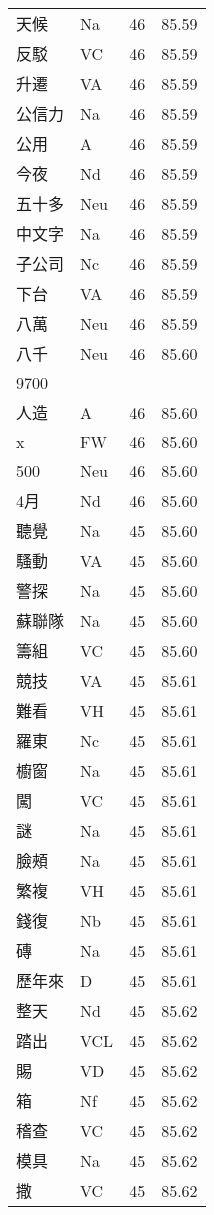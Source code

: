 \documentclass[twocolumn]{book}
\begin{document}
\begin{supertabular}{llrr}
天候 & Na & 46 &  85.59\\
反駁 & VC & 46 &  85.59\\
升遷 & VA & 46 &  85.59\\
公信力 & Na & 46 &  85.59\\
公用 & A & 46 &  85.59\\
今夜 & Nd & 46 &  85.59\\
五十多 & Neu & 46 &  85.59\\
中文字 & Na & 46 &  85.59\\
子公司 & Nc & 46 &  85.59\\
下台 & VA & 46 &  85.59\\
八萬 & Neu & 46 &  85.59\\
八千 & Neu & 46 &  85.60\\
9700\\
人造 & A & 46 &  85.60\\
x & FW & 46 &  85.60\\
500 & Neu & 46 &  85.60\\
4月 & Nd & 46 &  85.60\\
聽覺 & Na & 45 &  85.60\\
騷動 & VA & 45 &  85.60\\
警探 & Na & 45 &  85.60\\
蘇聯隊 & Na & 45 &  85.60\\
籌組 & VC & 45 &  85.60\\
競技 & VA & 45 &  85.61\\
難看 & VH & 45 &  85.61\\
羅東 & Nc & 45 &  85.61\\
櫥窗 & Na & 45 &  85.61\\
闖 & VC & 45 &  85.61\\
謎 & Na & 45 &  85.61\\
臉頰 & Na & 45 &  85.61\\
繁複 & VH & 45 &  85.61\\
錢復 & Nb & 45 &  85.61\\
磚 & Na & 45 &  85.61\\
歷年來 & D & 45 &  85.61\\
整天 & Nd & 45 &  85.62\\
踏出 & VCL & 45 &  85.62\\
賜 & VD & 45 &  85.62\\
箱 & Nf & 45 &  85.62\\
稽查 & VC & 45 &  85.62\\
模具 & Na & 45 &  85.62\\
撒 & VC & 45 &  85.62\\

\end{supertabular}
\end{document}
